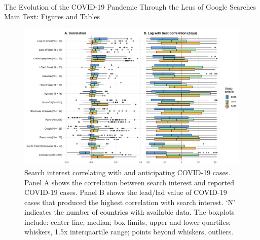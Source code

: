 \documentclass{article}
\begin{document}
\thispagestyle{empty}
\begin{center}
~~ \\ 
\bigskip 
\bigskip 
\bigskip 
\bigskip 
\bigskip 
\bigskip 
\bigskip 
\bigskip 
\bigskip 
\bigskip 
\bigskip 
\bigskip 
\bigskip 
\bigskip 
    \Huge The Evolution of the COVID-19 Pandemic Through the Lens of Google Searches \\
    \bigskip
    \bigskip
    \bigskip
    \Huge Main Text: Figures and Tables
\end{center}
    \bigskip
    \bigskip
    \bigskip
    \bigskip
    \bigskip
    \bigskip
    \bigskip
    \bigskip
    \bigskip
    \bigskip
    \bigskip
    \bigskip
    \bigskip
    \bigskip
    \bigskip
    \bigskip
    \bigskip
    \bigskip
    \bigskip
    \bigskip
    \bigskip
    \bigskip
    \bigskip

\newpage

\begin{figure}[t]
    \includegraphics[width=1\textwidth]{figures/cor_lag_fig.png}
    \caption{Search interest correlating with and anticipating COVID-19 cases. Panel A shows the correlation between search interest and \textcolor{black}{reported} COVID-19 cases. Panel B shows the lead/lad value of COVID-19 cases that produced the highest correlation with search interest. \textcolor{black}{`N' indicates the number of countries with available data.} The boxplots include: center line, median; box limits, upper and lower quartiles; whiskers, 1.5x interquartile range; points beyond whiskers, outliers.}
    \label{fig:corlag_figure}
\end{figure}
\end{document}
